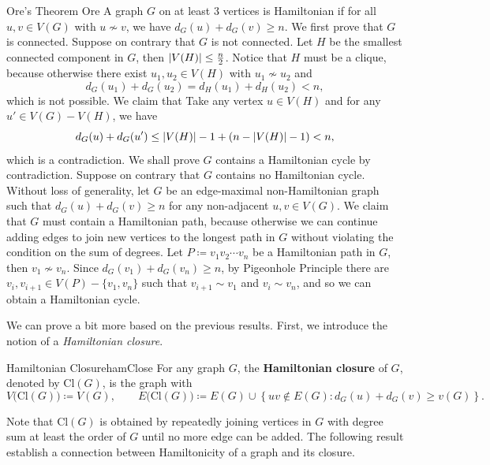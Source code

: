 \documentclass[math]{amznotes}
\theoremstyle{remark}
\newcommand{\0}{\mathbf{0}}
\newcommand{\1}{\mathbf{1}}
\begin{document}
\begin{thmbox}{Ore's Theorem} {Ore}
    A graph $G$ on at least $3$ vertices is Hamiltonian if for all $u, v \in V(G)$ with $u \not\sim v$, we have $d_G(u) + d_G(v) \geq n$.
    \tcblower
    We first prove that $G$ is connected. Suppose on contrary that $G$ is not connected. Let $H$ be the smallest connected component in $G$, then ${\left\lvert {V(H)} \right\rvert} \leq \frac{n}{2}$. Notice that $H$ must be a clique, because otherwise there exist $u_1, u_2 \in V(H)$ with $u_1 \not\sim u_2$ and
    \begin{equation*}
        d_G(u_1) + d_G(u_2) = d_H(u_1) + d_H(u_2) < n,
    \end{equation*}
    which is not possible. We claim that Take any vertex $u \in V(H)$ and for any $u' \in V(G) - V(H)$, we have 
    \begin{equation*}
        d_G(u) + d_G(u') \leq {\left\lvert {V(H)} \right\rvert} - 1 + \left(n - {\left\lvert {V(H)} \right\rvert} - 1\right) < n,
    \end{equation*}
    which is a contradiction. We shall prove $G$ contains a Hamiltonian cycle by contradiction. Suppose on contrary that $G$ contains no Hamiltonian cycle. Without loss of generality, let $G$ be an edge-maximal non-Hamiltonian graph such that $d_G(u) + d_G(v) \geq n$ for any non-adjacent $u, v \in V(G)$. We claim that $G$ must contain a Hamiltonian path, because otherwise we can continue adding edges to join new vertices to the longest path in $G$ without violating the condition on the sum of degrees. Let $P \coloneqq v_1v_2\cdots v_n$ be a Hamiltonian path in $G$, then $v_1 \not\sim v_n$. Since $d_G(v_1) + d_G(v_n) \geq n$, by Pigeonhole Principle there are $v_i, v_{i + 1} \in V(P) - \{v_1, v_n\}$ such that $v_{i + 1} \sim v_1$ and $v_i \sim v_n$, and so we can obtain a Hamiltonian cycle.
\end{thmbox}
We can prove a bit more based on the previous results. First, we introduce the notion of a \textit{Hamiltonian closure}.
\begin{dfnbox}{Hamiltonian Closure}{hamClose}
    For any graph $G$, the {\color{red} \textbf{Hamiltonian closure}} of $G$, denoted by $\mathrm{Cl}(G)$, is the graph with
    \begin{equation*}
        V\bigl(\mathrm{Cl}(G)\bigr) \coloneqq V(G), \qquad E\bigl(\mathrm{Cl}(G)\bigr) \coloneqq E(G) \cup \left\{uv \notin E(G) \colon d_G(u) + d_G(v) \geq v(G)\right\}.
    \end{equation*}
\end{dfnbox}
Note that $\mathrm{Cl}(G)$ is obtained by repeatedly joining vertices in $G$ with degree sum at least the order of $G$ until no more edge can be added. The following result establish a connection between Hamiltonicity of a graph and its closure.
\end{document}
